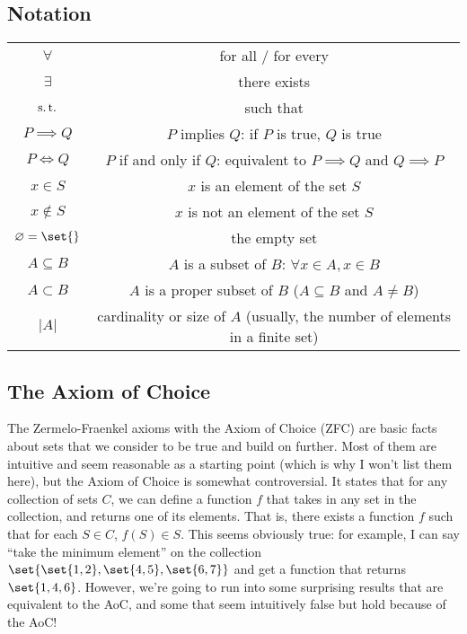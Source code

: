 \documentclass[../analysis.tex]{subfiles}
\begin{document}
\subsection{Notation}
\begin{center}
    \begin{tabular}{cc}
        $\forall$ & for all / for every\\
        $\exists$ & there exists\\
        $\operatorname{s.t.}$ & such that\\
        $P \implies Q$ & $P$ implies $Q$: if $P$ is true, $Q$ is true\\
        $P \iff Q$ & $P$ if and only if $Q$: equivalent to $P \implies Q$ and $Q \implies P$\\
        $x \in S$ & $x$ is an element of the set $S$\\
        $x \not\in S$ & $x$ is not an element of the set $S$\\
        $\varnothing = \set{}$ & the empty set\\
        $A \subseteq B$ & $A$ is a subset of $B$: $\forall x \in A, x \in B$\\
        $A \subset B$ & $A$ is a proper subset of $B$ ($A \subseteq B$ and $A \neq B$)\\
        $|A|$ & cardinality or size of $A$ (usually, the number of elements in a finite set)
    \end{tabular}
\end{center}

\subsection{The Axiom of Choice}

The Zermelo-Fraenkel axioms with the Axiom of Choice (ZFC) are basic facts about sets that we consider to be true and build on further. Most of them are intuitive and seem reasonable as a starting point (which is why I won't list them here), but the Axiom of Choice is somewhat controversial. It states that for any collection of sets $C$, we can define a function $f$ that takes in any set in the collection, and returns one of its elements. That is, there exists a function $f$ such that for each $S \in C$, $f(S) \in S$. This seems obviously true: for example, I can say ``take the minimum element'' on the collection $\set{\set{1, 2}, \set{4, 5}, \set{6, 7}}$ and get a function that returns $\set{1, 4, 6}$. However, we're going to run into some surprising results that are equivalent to the AoC, and some that seem intuitively false but hold because of the AoC!
\end{document}
